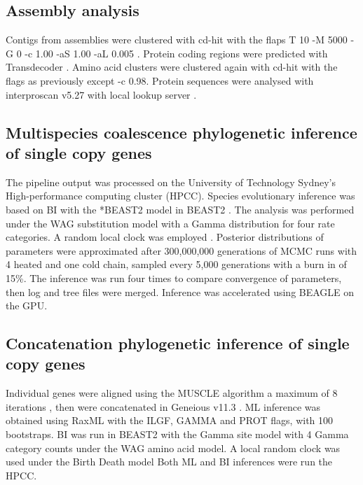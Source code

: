 \documentclass[12pt]{article}
\begin{document}
\subsection*{Assembly analysis}
Contigs from assemblies were clustered with cd-hit with the flaps T 10 -M 5000 -G 0 -c 1.00 -aS 1.00 -aL 0.005 \cite{fu2012cd}. 
Protein coding regions were predicted with Transdecoder \cite{haas2016transdecoder}.
Amino acid clusters were clustered again with cd-hit with the flags as previously except -c 0.98.
Protein sequences were analysed with interproscan v5.27 with local lookup server \cite{quevillon2005interproscan}.

\subsection*{Multispecies coalescence phylogenetic inference of single copy genes}
The pipeline output was processed on the University of Technology Sydney's High-performance computing cluster (HPCC).
Species evolutionary inference was based on BI with the *BEAST2 model in BEAST2 \cite{bouckaert2014beast}. 
The analysis was performed under the WAG substitution model \cite{whelan2001general} with a Gamma distribution for four rate categories. 
A random local clock was employed \cite{drummond2010bayesian}. 
Posterior distributions of parameters were approximated after 300,000,000 generations of MCMC runs with 4 heated and one cold chain, sampled every 5,000 generations  with a burn in of 15\%. 
The inference was run four times to compare convergence of parameters, then log and tree files were merged. 
Inference was accelerated using BEAGLE \cite{ayres2011beagle} on the GPU.

\subsection*{Concatenation phylogenetic inference of single copy genes}
Individual genes were aligned using the MUSCLE algorithm a maximum of 8 iterations \cite{edgar2004muscle}, then were concatenated in Geneious v11.3 \cite{kearse2012geneious}. 
ML inference was obtained using RaxML \cite{stamatakis2014raxml} with the ILGF, GAMMA and PROT flags, with 100 bootstraps.
BI was run in BEAST2 with the Gamma site model with 4 Gamma category counts under the WAG amino acid model. A local random clock was used  under the Birth Death model %
Both ML and BI inferences were run the HPCC. 
\end{document}
